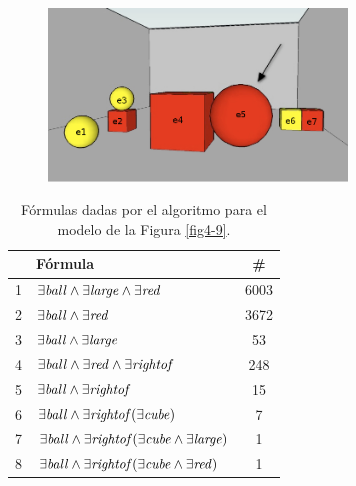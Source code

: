 \begin{figure}[H]
\centering
\includegraphics[width=300]{images/22.jpg}
\label{GRE3D7-stimulus-22-apendice}
\end{figure}


\label{formulas-gre3d7}
\begin{table}[H]
\begin{center}
\begin{tabular}{|l|l|c|}
\hline
&F\'ormula			      &  \# \\ \hline \hline

1&$\exists \mathit{ball} \land \exists \mathit{large} \land \exists \mathit{red}$		&6003 \\ \hline
2&$\exists \mathit{ball} \land \exists \mathit{red}$		&3672 \\ \hline
3&$\exists \mathit{ball} \land \exists \mathit{large}$		&53 \\ \hline
4&$\exists \mathit{ball} \land \exists \mathit{red} \land \exists \mathit{rightof}$	&	248 \\ \hline
5&$\exists \mathit{ball} \land \exists \mathit{rightof}$		&15 \\ \hline
6&$\exists \mathit{ball} \land \exists \mathit{rightof}(\exists \mathit{cube})$	&	7 \\ \hline
7&$\exists \mathit{ball} \land \exists \mathit{rightof}(\exists \mathit{cube} \land \exists \mathit{large})$&		1 \\ \hline
8&$\exists \mathit{ball} \land \exists \mathit{rightof}(\exists \mathit{cube} \land \exists \mathit{red})$		&1 \\ \hline

\end{tabular}

\caption{F\'ormulas dadas por el algoritmo para el modelo de la Figura \protect\ref{fig4-9}.}\label{formulas-mapa-gre3d7-apendice}
\end{center}
\end{table}


